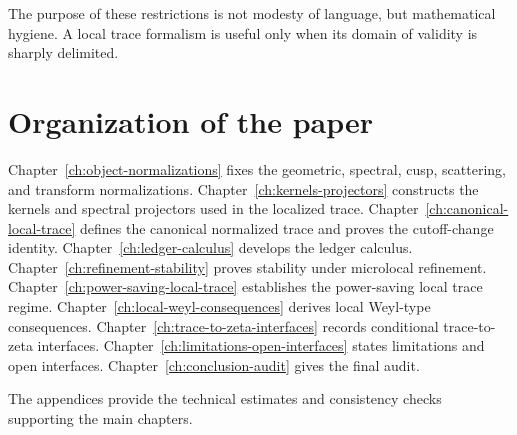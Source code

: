 The purpose of these restrictions is not modesty of language, but mathematical hygiene.  A local trace formalism is useful only when its domain of validity is sharply delimited.

\section{Organization of the paper}
\label{sec:intro-organization}

Chapter~\ref{ch:object-normalizations} fixes the geometric, spectral, cusp, scattering, and transform normalizations.  Chapter~\ref{ch:kernels-projectors} constructs the kernels and spectral projectors used in the localized trace.  Chapter~\ref{ch:canonical-local-trace} defines the canonical normalized trace and proves the cutoff-change identity.  Chapter~\ref{ch:ledger-calculus} develops the ledger calculus.  Chapter~\ref{ch:refinement-stability} proves stability under microlocal refinement.  Chapter~\ref{ch:power-saving-local-trace} establishes the power-saving local trace regime.  Chapter~\ref{ch:local-weyl-consequences} derives local Weyl-type consequences.  Chapter~\ref{ch:trace-to-zeta-interfaces} records conditional trace-to-zeta interfaces.  Chapter~\ref{ch:limitations-open-interfaces} states limitations and open interfaces.  Chapter~\ref{ch:conclusion-audit} gives the final audit.

The appendices provide the technical estimates and consistency checks supporting the main chapters.
